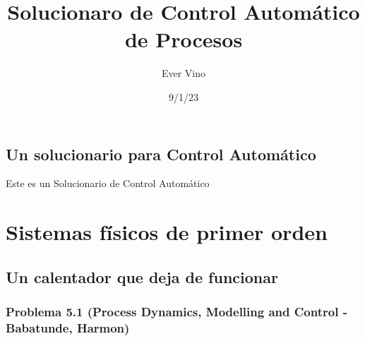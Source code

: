 \documentclass[
  letterpaper,
  DIV=11,
  numbers=noendperiod]{scrreprt}
\title{Solucionaro de Control Automático de Procesos}
\author{Ever Vino}
\date{9/1/23}
\begin{document}
\maketitle
\ifdefined\Shaded\renewenvironment{Shaded}{\begin{tcolorbox}[sharp corners, boxrule=0pt, breakable, enhanced, borderline west={3pt}{0pt}{shadecolor}, interior hidden, frame hidden]}{\end{tcolorbox}}\fi


\hypertarget{un-solucionario-para-control-automuxe1tico}{%
\chapter*{Un solucionario para Control
Automático}\label{un-solucionario-para-control-automuxe1tico}}


Este es un Solucionario de Control Automático

\part{Sistemas físicos de primer orden}

\hypertarget{un-calentador-que-deja-de-funcionar}{%
\chapter{Un calentador que deja de
funcionar}\label{un-calentador-que-deja-de-funcionar}}

\hypertarget{problema-5.1-process-dynamics-modelling-and-control---babatunde-harmon}{%
\section*{Problema 5.1 (Process Dynamics, Modelling and Control -
Babatunde,
Harmon)}\label{problema-5.1-process-dynamics-modelling-and-control---babatunde-harmon}}

\end{document}
